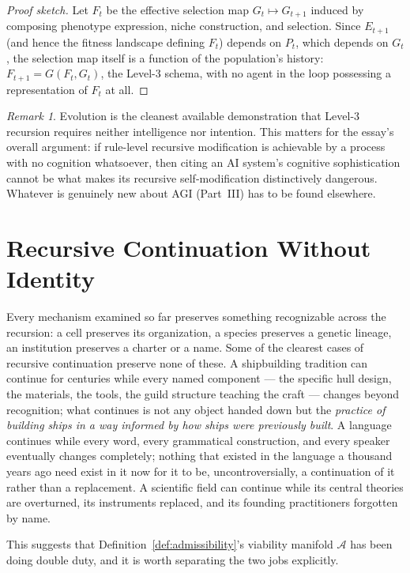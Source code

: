 \documentclass[11pt,a4paper]{article}
\theoremstyle{plain}
\theoremstyle{definition}
\theoremstyle{remark}
\newtheorem{remark}[theorem]{Remark}
\newcommand{\Adm}{\mathcal{A}}
\begin{document}
\begin{proof}[Proof sketch]
Let $F_t$ be the effective selection map $G_t \mapsto G_{t+1}$ induced by composing phenotype expression, niche construction, and selection. Since $E_{t+1}$ (and hence the fitness landscape defining $F_t$) depends on $P_t$, which depends on $G_t$, the selection map itself is a function of the population's history: $F_{t+1} = G(F_t, G_t)$, the Level-3 schema, with no agent in the loop possessing a representation of $F_t$ at all.
\end{proof}

\begin{remark}
Evolution is the cleanest available demonstration that Level-3 recursion requires neither intelligence nor intention. This matters for the essay's overall argument: if rule-level recursive modification is achievable by a process with no cognition whatsoever, then citing an AI system's cognitive sophistication cannot be what makes its recursive self-modification distinctively dangerous. Whatever is genuinely new about AGI (Part~III) has to be found elsewhere.
\end{remark}

\section{Recursive Continuation Without Identity}
\label{sec:continuation-without-identity}

Every mechanism examined so far preserves something recognizable across the recursion: a cell preserves its organization, a species preserves a genetic lineage, an institution preserves a charter or a name. Some of the clearest cases of recursive continuation preserve none of these. A shipbuilding tradition can continue for centuries while every named component — the specific hull design, the materials, the tools, the guild structure teaching the craft — changes beyond recognition; what continues is not any object handed down but the \emph{practice of building ships in a way informed by how ships were previously built}. A language continues while every word, every grammatical construction, and every speaker eventually changes completely; nothing that existed in the language a thousand years ago need exist in it now for it to be, uncontroversially, a continuation of it rather than a replacement. A scientific field can continue while its central theories are overturned, its instruments replaced, and its founding practitioners forgotten by name.

This suggests that Definition~\ref{def:admissibility}'s viability manifold $\Adm$ has been doing double duty, and it is worth separating the two jobs explicitly.
\end{document}
